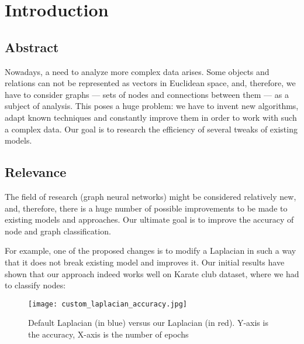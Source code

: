 \section{Introduction}

\subsection{Abstract}
    Nowadays, a need to analyze more complex data arises.
    Some objects and relations can not be represented as vectors in Euclidean space, and, therefore, we have to consider graphs --- sets of nodes and connections between them --- as a subject of analysis.
    This poses a huge problem: we have to invent new algorithms, adapt known techniques and constantly improve them in order to work with such a complex data.
    Our goal is to research the efficiency of several tweaks of existing models. 
    
\subsection{Relevance}
    The field of research (graph neural networks) might be considered relatively new, and, therefore, there is a huge number of possible improvements to be made to existing models and approaches.
    Our ultimate goal is to improve the accuracy of node and graph classification.

    For example, one of the proposed changes is to modify a Laplacian in such a way that it does not break existing model and improves it.
    Our initial results have shown that our approach indeed works well on Karate club dataset, where we had to classify nodes:

    \begin{figure}[h]
        \centering
        \texttt{[image: custom\_laplacian\_accuracy.jpg]}
        \caption{Default Laplacian (in blue) versus our Laplacian (in red). Y-axis is the accuracy, X-axis is the number of epochs}
    \end{figure}

